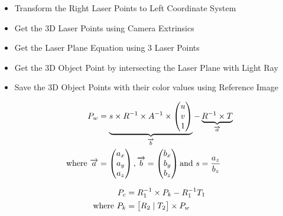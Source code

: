 \begin{itemize}
	\item Transform the Right Laser Points to Left Coordinate System
  \item Get the 3D Laser Points using Camera Extrinsics
  \item Get the Laser Plane Equation using 3 Laser Points
  \item Get the 3D Object Point by intersecting the
				Laser Plane with Light Ray
  \item Save the 3D Object Points with their color values 
				using Reference Image
\end{itemize}


\begin{align}
	\label{equation:3dlaserpoint}				
	P_w &= 	\underbrace{s \times R^{-1} 
 					 							\times A^{-1} 
					 							\times \begin{pmatrix}
								  								u \\
								  								v \\
								  								1 \\
								 								\end{pmatrix}
										 }_\text{$\overrightarrow{b}$}
					- 
					\underbrace{
											R^{-1} \times T					
										 }_\text{$\overrightarrow{a}$} \\
	\text{where}~	
	\overrightarrow{a} &= \begin{pmatrix}
													a_x \\
													a_y \\
													a_z \\
												\end{pmatrix}, 
	\overrightarrow{b} = \begin{pmatrix}
													b_x \\
													b_y \\
													b_z \\
												\end{pmatrix} \text{and}~
	s = \frac{a_z}{b_z} \notag
\end{align}

\begin{align}
	\label{equation:right2left}				
	P_c &= R_1^{-1} \times P_k - R_1^{-1}T_1 \\
	\text{where}~ 
	P_k &= \begin{bmatrix}
									R_2 \mid T_2
 				  \end{bmatrix} \times P_w \notag
\end{align}

